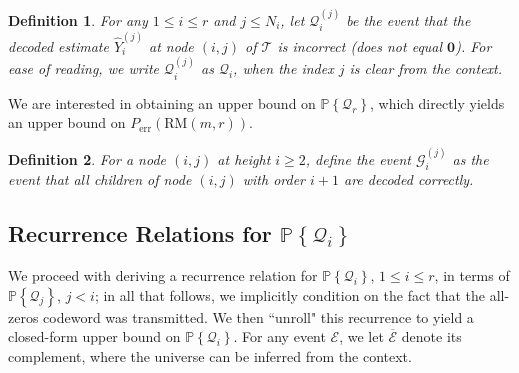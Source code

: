 \documentclass[conference,letterpaper]{IEEEtran}
\newcommand{\cG}{\ensuremath{\mathcal{G}}}
\newcommand{\cQ}{\ensuremath{\mathcal{Q}}}
\newcommand{\PR}[1]{{\mathbb{P}}\left\{ #1\right\}}
\newtheorem{definition}{Definition}
\newtheorem{remark}{Remark}
\begin{document}
\begin{definition}
     For any $1\leq i\leq r$ and $j\leq N_i$, let $ \cQ_i^{(j)}$ be the event that the decoded estimate $\widehat{Y}_i^{(j)}$ at node $(i,j)$ of $\mathcal{T}$ is incorrect (does not equal $\mathbf{0}$). For ease of reading, we write $ \cQ_i^{(j)}$ as $\cQ_i$, when the index $j$ is clear from the context. 
\end{definition}
We are interested in obtaining an upper bound on $\PR{ \cQ_r}$, which directly yields an upper bound on $P_\text{err}(\text{RM}(m,r))$.
 
\begin{definition}

For a node $(i, j)$ at height $i \geq 2$, define the event $\cG_{i}^{(j)} $ as the event that all children of node $ (i,j) $ with order $i+1$ are decoded correctly.  
\end{definition}
\subsection{Recurrence Relations for $\PR{ \cQ_i}$}
We proceed with deriving a recurrence relation for $\PR{ \cQ_i}$, $1\leq i\leq r$, in terms of $\PR{ \cQ_j}$, $j<i$; in all that follows, we implicitly condition on the fact that the all-zeros codeword was transmitted. We then ``unroll" this recurrence to yield a closed-form upper bound on $\PR{ \cQ_i}$. For any event $\mathcal{E}$, we let $\overline{\mathcal{E}}$ denote its complement, where the universe can be inferred from the context.
\end{document}
